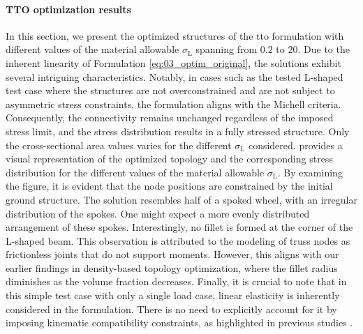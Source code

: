 \paragraph{TTO optimization results}
In this section, we present the optimized structures of the \gls{tto} formulation with different values of the material allowable $\sigma_\text{L}$ spanning from $0.2$ to $20$. Due to the inherent linearity of Formulation \ref{eq:03_optim_original}, the solutions exhibit several intriguing characteristics. Notably, in cases such as the tested L-shaped test case where the structures are not overconstrained and are not subject to asymmetric stress constraints, the formulation aligns with the Michell criteria. Consequently, the connectivity remains unchanged regardless of the imposed stress limit, and the stress distribution results in a fully stressed structure. Only the cross-sectional area values varies for the different $\sigma_\text{L}$ considered.  provides a visual representation of the optimized topology and the corresponding stress distribution for the different values of the material allowable $\sigma_\text{L}$. By examining the figure, it is evident that the node positions are constrained by the initial ground structure. The solution resembles half of a spoked wheel, with an irregular distribution of the spokes. One might expect a more evenly distributed arrangement of these spokes. Interestingly, no fillet is formed at the corner of the L-shaped beam. This observation is attributed to the modeling of truss nodes as frictionless joints that do not support moments. However, this aligns with our earlier findings in density-based topology optimization, where the fillet radius diminishes as the volume fraction decreases. Finally, it is crucial to note that in this simple test case with only a single load case, linear elasticity is inherently considered in the formulation. There is no need to explicitly account for it by imposing kinematic compatibility constraints, as highlighted in previous studies .
